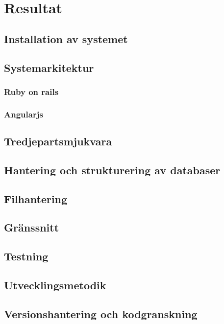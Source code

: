 \chapter{Resultat}

\section{Installation av systemet}

\section{Systemarkitektur}

\subsection{Ruby on rails}

\subsection{Angularjs}

\section{Tredjepartsmjukvara}

\section{Hantering och strukturering av databaser}

\section{Filhantering}

\section{Gränssnitt}

\section{Testning}

\section{Utvecklingsmetodik}

\section{Versionshantering och kodgranskning}
